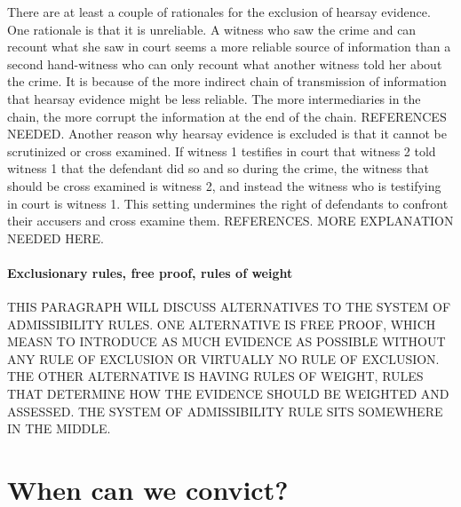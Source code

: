 \documentclass[10pt]{article}
\begin{document}
There are at least a couple of rationales for the exclusion of hearsay evidence. One rationale is that it is unreliable. A witness who saw the crime and can recount what she saw in court seems a more reliable source of information than a second hand-witness who can only recount what another witness told her about the crime. It is because of the more indirect chain of transmission of information that hearsay evidence might be less reliable. The more intermediaries in the chain, the more corrupt the information at the end of the chain. REFERENCES NEEDED.  Another reason why hearsay evidence is excluded is that it cannot be  scrutinized or cross examined. If witness 1 testifies in court that witness 2 told witness 1 that the defendant did so and so during the crime, the witness that should be cross examined is witness 2, and instead the witness who is testifying in court is witness 1. This setting undermines the right of defendants to confront their accusers and cross examine them. REFERENCES. MORE EXPLANATION NEEDED HERE. 









\paragraph{Exclusionary rules, free proof, rules of weight}

THIS PARAGRAPH WILL DISCUSS ALTERNATIVES TO THE SYSTEM OF ADMISSIBILITY RULES. ONE ALTERNATIVE IS FREE PROOF, WHICH MEASN TO INTRODUCE AS MUCH EVIDENCE AS POSSIBLE WITHOUT ANY RULE OF EXCLUSION OR VIRTUALLY NO RULE OF EXCLUSION. THE OTHER ALTERNATIVE IS HAVING RULES OF WEIGHT, RULES THAT DETERMINE HOW THE EVIDENCE SHOULD BE WEIGHTED AND ASSESSED. THE SYSTEM OF ADMISSIBILITY RULE SITS SOMEWHERE IN THE MIDDLE.






\section{When can we convict?}


\end{document}

